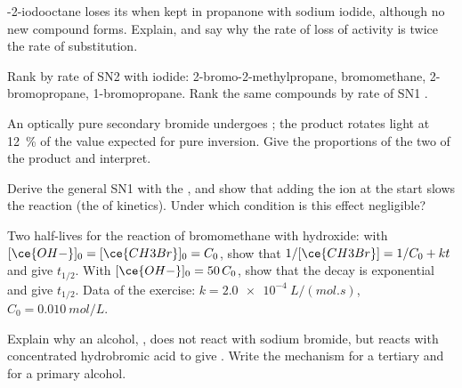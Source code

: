 \begin{exercise}[$\star\star$]\label{exo:b1:nucleophilic-substitution:7}
-2-iodooctane loses its  when kept in propanone
with sodium iodide, although no new compound forms. Explain, and say why
the rate of loss of activity is twice the rate of substitution.
\end{exercise}

\begin{exercise}[$\star\star$]\label{exo:b1:nucleophilic-substitution:8}
Rank by rate of SN2 with iodide: 2-bromo-2-methylpropane, bromomethane,
2-bromopropane, 1-bromopropane. Rank the same compounds by rate of SN1
.
\end{exercise}

\begin{exercise}[$\star\star$]\label{exo:b1:nucleophilic-substitution:9}
An optically pure secondary bromide undergoes ; the product
rotates light at \qty{12}{\percent} of the value expected for pure
inversion. Give the proportions of the two  of the product and
interpret.
\end{exercise}

\begin{exercise}[$\star\star\star$]\label{exo:b1:nucleophilic-substitution:10}
Derive the general SN1  with the , and
show that adding the  ion  at the start slows the
reaction (the  of kinetics). Under which condition is
this effect negligible?
\end{exercise}

\begin{exercise}[$\star\star\star$]\label{exo:b1:nucleophilic-substitution:11}
Two half-lives for the reaction of bromomethane with hydroxide: with
$[\ce{OH-}]_0 = [\ce{CH3Br}]_0 = C_0$, show that $1/[\ce{CH3Br}] = 1/C_0 +
kt$ and give $t_{1/2}$. With $[\ce{OH-}]_0 = 50\,C_0$, show that the
decay is exponential and give $t_{1/2}$. Data of the exercise: $k =
\qty{2.0e-4}{L/(mol.s)}$, $C_0 = \qty{0.010}{mol/L}$.
\end{exercise}

\begin{exercise}[$\star\star\star$]\label{exo:b1:nucleophilic-substitution:12}
Explain why an alcohol, , does not react with sodium bromide, but
reacts with concentrated hydrobromic acid to give . Write the
mechanism for a tertiary and for a primary alcohol.
\end{exercise}

